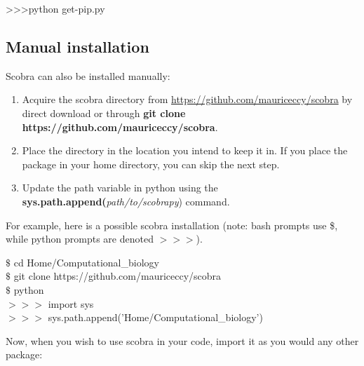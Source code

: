 \begin{mdframed}
\textgreater \textgreater\textgreater \quad python get-pip.py
\end{mdframed}




\subsection{Manual installation}

Scobra can also be installed manually:
\begin{enumerate}
\item Acquire the scobra directory from \url{https://github.com/mauriceccy/scobra} by direct download or through \textbf{git clone \\https://github.com/mauriceccy/scobra}.
\item Place the directory in the location you intend to keep it in. If you place the package in your home directory, you can skip the next step.
\item Update the path variable in python using the\\
\textbf{sys.path.append(}\textit{path/to/scobrapy}) command.
\end{enumerate}

For example, here is a possible scobra installation (note: bash prompts use \$, while python prompts are denoted $>>>$).
\begin{framed}
$\$$ cd Home/Computational\_biology\\
$\$$ git clone https://github.com/mauriceccy/scobra\\
$\$$ python\\
$>>>$ import sys\\
$>>>$ sys.path.append('Home/Computational\_biology')
\end{framed}

Now, when you wish to use scobra in your code, import it as you would any other package:

